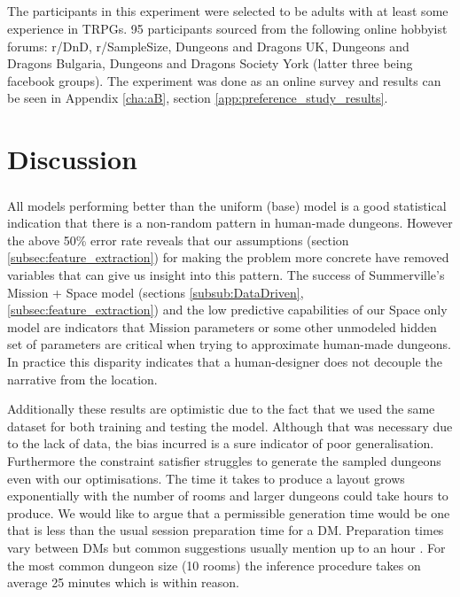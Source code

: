 \documentclass{UoYCSproject}
\begin{document}
\paragraph{}
The participants in this experiment were selected to be adults with at least some experience in TRPGs. 95 participants sourced from the following online hobbyist forums: r/DnD, r/SampleSize, Dungeons and Dragons UK, Dungeons and Dragons Bulgaria, Dungeons and Dragons Society York (latter three being facebook groups). The experiment was done as an online survey and results can be seen in Appendix \ref{cha:aB}, section \ref{app:preference_study_results}.


\chapter{Discussion}
\paragraph{}
All models performing better than the uniform (base) model is a good statistical indication that there is a non-random pattern in human-made dungeons. However the above 50\% error rate reveals that our assumptions (section \ref{subsec:feature_extraction}) for making the problem more concrete have removed variables that can give us insight into this pattern. The success of Summerville's Mission + Space model (sections \ref{subsub:DataDriven}, \ref{subsec:feature_extraction}) and the low predictive capabilities of our Space only model are indicators that Mission parameters or some other unmodeled hidden set of parameters are critical when trying to approximate human-made dungeons. In practice this disparity indicates that a human-designer does not decouple the narrative from the location.

Additionally these results are optimistic due to the fact that we used the same dataset for both training and testing the model. Although that was necessary due to the lack of data, the bias incurred is a sure indicator of poor generalisation. Furthermore the constraint satisfier struggles to generate the sampled dungeons even with our optimisations. The time it takes to produce a layout grows exponentially with the number of rooms and larger dungeons could take hours to produce. We would like to argue that a permissible generation time would be one that is less than the usual session preparation time for a DM. Preparation times vary between DMs but common suggestions usually mention up to an hour \parencite{SessionPrepTime}. For the most common dungeon size (10 rooms) the inference procedure takes on average 25 minutes which is within reason. 
\end{document}
